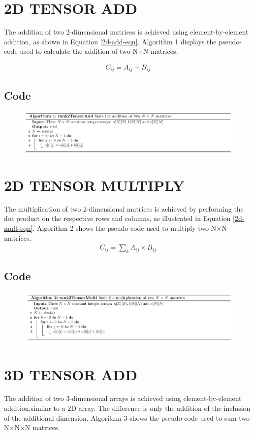 \section{2D TENSOR ADD}
The addition of two 2-dimensional matrices is achieved using element-by-element addition, as shown in Equation \ref{2d-add-eqn}. Algorithm 1 displays the pseudo-code used to calculate the addition of two N$\times$N matrices.

\begin{align}
C_{ij} = A_{ij} + B_{ij} \label{2d-add-eqn}
\end{align}
\subsection{Code}
\begin{figure}[H]
\includegraphics[width=\textwidth]{build/Algo1.png}
\end{figure}
\section{2D TENSOR MULTIPLY}
The multiplication of two 2-dimensional matrices is achieved by performing the dot product on the respective
rows and columns, as illustrated in Equation \ref{2d-mult-eqn}. Algorithm 2 shows the pseudo-code used to multiply two N$\times$N matrices.
\begin{align}
C_{ij} = \sum_{k} A_{ij} \times B_{ij} \label{2d-mult-eqn}
\end{align}

\subsection{Code}
\begin{figure}[H]
\includegraphics[width=\textwidth]{build/Algo2.png}
\end{figure}
\section{3D TENSOR ADD}
The addition of two 3-dimensional arrays is achieved using element-by-element addition,similar to a 2D array. The difference is only the addition of the inclusion of the additional dimension. Algorithm 3 shows
the pseudo-code used to sum two N$\times$N$\times$N matrices.

